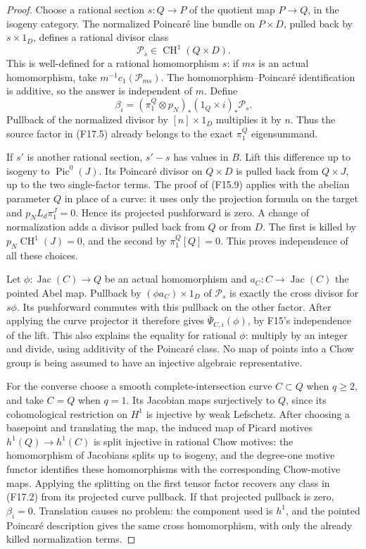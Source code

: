 \documentclass[11pt]{article}
\theoremstyle{remark}\newtheorem{remark}[theorem]{Remark}
\begin{document}
\begin{proof}
Choose a rational section $s:Q\to P$ of the quotient map
$P\to Q$, in the isogeny category.  The normalized Poincar\'e
line bundle on $P\times D$, pulled back by $s\times1_D$,
defines a rational divisor class
\[
                         \mathcal P_s\in\operatorname{CH}^1(Q\times D).
 \tag{F17.4}
\]
This is well-defined for a rational homomorphism $s$: if $ms$
is an actual homomorphism, take $m^{-1}c_1(\mathcal P_{ms})$.
The homomorphism--Poincar\'e identification is additive, so the
answer is independent of $m$.  Define
\[
 \beta_i=(\pi_1^Q\otimes p_N)_*(1_Q\times i)_*\mathcal P_s.
 \tag{F17.5}
\]
Pullback of the normalized divisor by $[n]\times1_D$ multiplies
it by $n$.  Thus the source factor in (F17.5) already belongs
to the exact $\pi_1^Q$ eigensummand.

If $s'$ is another rational section, $s'-s$ has values in $B$.
Lift this difference up to isogeny to
$\operatorname{Pic}^0(J)$.  Its Poincar\'e divisor on $Q\times D$
is pulled back from $Q\times J$, up to the two single-factor
terms.  The proof of (F15.9) applies with the abelian parameter
$Q$ in place of a curve: it uses only the projection formula
on the target and $p_N L_d\pi_1^J=0$.  Hence its projected
pushforward is zero.  A change of normalization adds a divisor
pulled back from $Q$ or from $D$.  The first is killed by
$p_N\operatorname{CH}^1(J)=0$, and the second by
$\pi_1^Q[Q]=0$.  This proves independence of all these choices.

Let $\phi:\operatorname{Jac}(C)\to Q$ be an actual homomorphism
and $a_C:C\to\operatorname{Jac}(C)$ the pointed Abel map.
Pullback by $(\phi a_C)\times1_D$ of $\mathcal P_s$ is exactly
the cross divisor for $s\phi$.  Its pushforward commutes with
this pullback on the other factor.  After applying the curve
projector it therefore gives
$\overline\Psi_{C,i}(\phi)$, by F15's independence of the
lift.  This also explains the equality for rational $\phi$:
multiply by an integer and divide, using additivity of the
Poincar\'e class.  No map of points into a Chow group is being
assumed to have an injective algebraic representative.

For the converse choose a smooth complete-intersection curve
$C\subset Q$ when $q\ge2$, and take $C=Q$ when $q=1$.
Its Jacobian maps surjectively to $Q$, since its cohomological
restriction on $H^1$ is injective by weak Lefschetz.
After choosing a basepoint and translating the map, the induced
map of Picard motives
$h^1(Q)\to h^1(C)$ is split injective in rational Chow motives:
the homomorphism of Jacobians splits up to isogeny, and the
degree-one motive functor identifies these homomorphisms with
the corresponding Chow-motive maps.  Applying the splitting on
the first tensor factor recovers any class in (F17.2) from its
projected curve pullback.  If that projected pullback is zero,
$\beta_i=0$.
Translation causes no problem: the component used is $h^1$,
and the pointed Poincar\'e description gives the same cross
homomorphism, with only the already killed normalization terms.


\end{proof}
\end{document}
